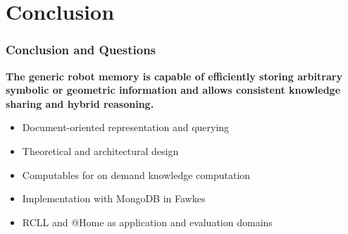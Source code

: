 \section{Conclusion}
\begin{frame}
  \frametitle{Conclusion and Questions}

  \begin{block}{} \centering\bfseries The generic robot memory is capable of
    efficiently storing arbitrary symbolic or geometric information
    and allows consistent knowledge sharing and hybrid reasoning.
  \end{block}

  \bigskip

  \begin{itemize}
  \item Document-oriented representation and querying
  \item Theoretical and architectural design
  \item Computables for on demand knowledge computation
  \item Implementation with MongoDB in Fawkes
  \item RCLL and @Home as application and evaluation domains
  \end{itemize}
\end{frame}


